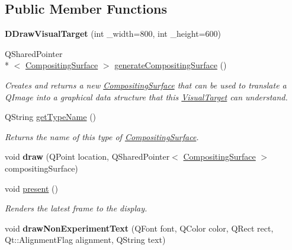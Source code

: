 \subsection*{Public Member Functions}
\begin{DoxyCompactItemize}
\item 
\hypertarget{struct_picto_1_1_d_draw_visual_target_a32e3b7f385732c8d3c7ce6dee96a8e92}{{\bfseries D\-Draw\-Visual\-Target} (int \-\_\-width=800, int \-\_\-height=600)}\label{struct_picto_1_1_d_draw_visual_target_a32e3b7f385732c8d3c7ce6dee96a8e92}

\item 
Q\-Shared\-Pointer\\*
$<$ \hyperlink{struct_picto_1_1_compositing_surface}{Compositing\-Surface} $>$ \hyperlink{struct_picto_1_1_d_draw_visual_target_a17bdde46a152308c90b6daad0dba5749}{generate\-Compositing\-Surface} ()
\begin{DoxyCompactList}\small\item\em Creates and returns a new \hyperlink{struct_picto_1_1_compositing_surface}{Compositing\-Surface} that can be used to translate a Q\-Image into a graphical data structure that this \hyperlink{class_picto_1_1_visual_target}{Visual\-Target} can understand. \end{DoxyCompactList}\item 
\hypertarget{struct_picto_1_1_d_draw_visual_target_ac53f334659a51f5994d95ab19726fa3d}{Q\-String \hyperlink{struct_picto_1_1_d_draw_visual_target_ac53f334659a51f5994d95ab19726fa3d}{get\-Type\-Name} ()}\label{struct_picto_1_1_d_draw_visual_target_ac53f334659a51f5994d95ab19726fa3d}

\begin{DoxyCompactList}\small\item\em Returns the name of this type of \hyperlink{struct_picto_1_1_compositing_surface}{Compositing\-Surface}. \end{DoxyCompactList}\item 
\hypertarget{struct_picto_1_1_d_draw_visual_target_ab77855ba0124156d87187120a8bffa54}{void {\bfseries draw} (Q\-Point location, Q\-Shared\-Pointer$<$ \hyperlink{struct_picto_1_1_compositing_surface}{Compositing\-Surface} $>$ compositing\-Surface)}\label{struct_picto_1_1_d_draw_visual_target_ab77855ba0124156d87187120a8bffa54}

\item 
void \hyperlink{struct_picto_1_1_d_draw_visual_target_aec7ebdbab7aca774786728c1e761a90a}{present} ()
\begin{DoxyCompactList}\small\item\em Renders the latest frame to the display. \end{DoxyCompactList}\item 
\hypertarget{struct_picto_1_1_d_draw_visual_target_a1663cfd078416f57d466a1715467d537}{void {\bfseries draw\-Non\-Experiment\-Text} (Q\-Font font, Q\-Color color, Q\-Rect rect, Qt\-::\-Alignment\-Flag alignment, Q\-String text)}\label{struct_picto_1_1_d_draw_visual_target_a1663cfd078416f57d466a1715467d537}

\end{DoxyCompactItemize}
